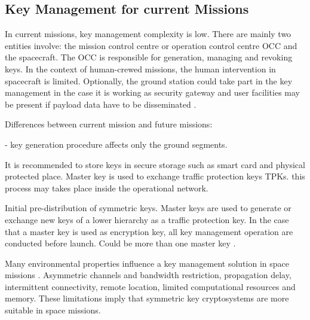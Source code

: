  
 



\subsection{Key Management for current Missions}

In current missions, key management complexity is low. There are mainly two entities involve: the mission control centre or operation control centre OCC and the spacecraft. The OCC is responsible for generation, managing and revoking keys. In the context of human-crewed missions, the human intervention in spacecraft is limited. Optionally, the ground station could take part in the key management in the case it is working as security gateway and user facilities may be present if payload data have to be disseminated \cite{book2011space}. 

Differences between current mission and future missions:

- key generation procedure affects only the ground segments. 

It is recommended to store keys in secure storage such as smart card and physical protected place. Master key is used to exchange traffic protection keys TPKs. this process may takes place inside the operational network. 

Initial pre-distribution of symmetric keys. Master keys are used to generate or exchange new keys of a lower hierarchy as a traffic protection key. In the case that a master key is used as encryption key, all key management operation are conducted before launch. Could be more than one master key \cite{book2011space}.

Many environmental properties influence a key management solution in space missions \cite{book2011space}. Asymmetric channels and bandwidth restriction, propagation delay, intermittent connectivity, remote location, limited computational resources and memory. These limitations imply that symmetric key cryptosystems are more suitable in space missions. 

